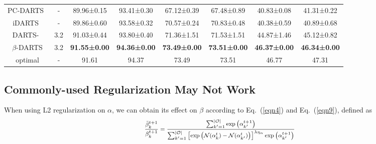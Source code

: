 \documentclass[10pt,twocolumn,letterpaper]{article}
\begin{document}
\begin{table*}[t]
\begin{center}
\begin{tabular}{cccccccc}
PC-DARTS~\cite{pc-darts}                 & -                                                                       & 89.96±0.15          & 93.41±0.30          & 67.12±0.39          & 67.48±0.89          & 40.83±0.08          & 41.31±0.22          \\
iDARTS~\cite{idarts}                   & -                                                                       & 89.86±0.60          & 93.58±0.32          & 70.57±0.24          & 70.83±0.48          & 40.38±0.59          & 40.89±0.68          \\
DARTS-~\cite{darts-}                   & 3.2                                                                     & 91.03±0.44          & 93.80±0.40          & 71.36±1.51          & 71.53±1.51          & 44.87±1.46          & 45.12±0.82          \\
$\beta$-DARTS               & 3.2                                                                     & \textbf{91.55±0.00} & \textbf{94.36±0.00} & \textbf{73.49±0.00} & \textbf{73.51±0.00} & \textbf{46.37±0.00} & \textbf{46.34±0.00} \\
optimal                  & -                                                                       & 91.61               & 94.37               & 73.49               & 73.51               & 46.77               & 47.31               \\ \hline
\end{tabular}
\end{center}
\vspace{-12pt}
\end{table*}


\subsection{Commonly-used Regularization May Not Work} \label{sec:alpha-beta}
When using L2 regularization on $\alpha$, we can obtain its effect on $\beta$ according to Eq.~(\ref{eqn4}) and Eq.~(\ref{eqn9}), defined as
\begin{equation} \label{eqn5}
\footnotesize
  \begin{split}
    \frac{\bar{\beta}_{k}^{t+1}}{\beta_{k}^{t+1}}=\frac{\sum_{k^{\prime}=1}^{\left | \mathcal{O}\right |} \exp \left(\alpha_{k^\prime}^{t+1}\right)}{\sum_{k^{\prime}=1}^{\left | \mathcal{O}\right |} \left[\exp \left(\mathcal{N}(\alpha_{k}^{t})-\mathcal{N}(\alpha_{k^{\prime}}^{t})\right)\right]^{\lambda \eta_{\alpha}} \exp \left(\alpha_{k^\prime}^{t+1}\right)} 
  \end{split}
  \vspace{-6pt}
\end{equation}
\end{document}
